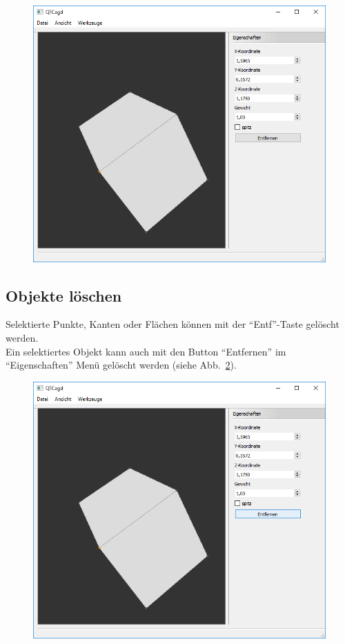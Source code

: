 \begin{figure}[H]
	\centering
	\includegraphics[scale=0.5]{content/pictures/4-PunkteVerschieben}
	\caption{}
	\label{fig:PunkteVerschieben}
\end{figure}

\subsection{Objekte löschen}
Selektierte Punkte, Kanten oder Flächen können mit der "`Entf"'-Taste gelöscht werden.\\
Ein selektiertes Objekt kann auch mit den Button "`Entfernen"' im "`Eigenschaften"' Menü gelöscht werden (siehe Abb.~\ref{fig:PunkteLoeschen}).

\begin{figure}[H]
	\centering
	\includegraphics[scale=0.5]{content/pictures/5-PunkteLoeschen}
	\caption{}
	\label{fig:PunkteLoeschen}	
\end{figure}


